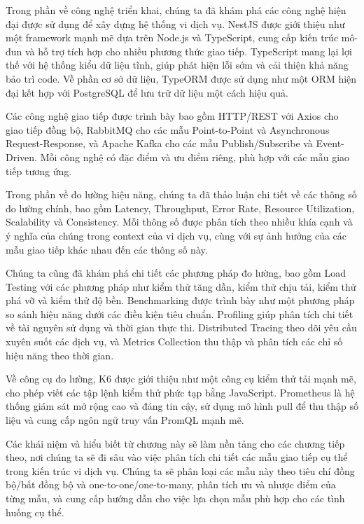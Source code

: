 Trong phần về công nghệ triển khai, chúng ta đã khám phá các công nghệ hiện đại được sử dụng để xây dựng hệ thống vi dịch vụ. NestJS được giới thiệu như một framework mạnh mẽ dựa trên Node.js và TypeScript, cung cấp kiến trúc mô-đun và hỗ trợ tích hợp cho nhiều phương thức giao tiếp. TypeScript mang lại lợi thế với hệ thống kiểu dữ liệu tĩnh, giúp phát hiện lỗi sớm và cải thiện khả năng bảo trì code. Về phần cơ sở dữ liệu, TypeORM được sử dụng như một ORM hiện đại kết hợp với PostgreSQL để lưu trữ dữ liệu một cách hiệu quả.

Các công nghệ giao tiếp được trình bày bao gồm HTTP/REST với Axios cho giao tiếp đồng bộ, RabbitMQ cho các mẫu Point-to-Point và Asynchronous Request-Response, và Apache Kafka cho các mẫu Publish/Subscribe và Event-Driven. Mỗi công nghệ có đặc điểm và ưu điểm riêng, phù hợp với các mẫu giao tiếp tương ứng.

Trong phần về đo lường hiệu năng, chúng ta đã thảo luận chi tiết về các thông số đo lường chính, bao gồm Latency, Throughput, Error Rate, Resource Utilization, Scalability và Consistency. Mỗi thông số được phân tích theo nhiều khía cạnh và ý nghĩa của chúng trong context của vi dịch vụ, cùng với sự ảnh hưởng của các mẫu giao tiếp khác nhau đến các thông số này.

Chúng ta cũng đã khám phá chi tiết các phương pháp đo lường, bao gồm Load Testing với các phương pháp như kiểm thử tăng dần, kiểm thử chịu tải, kiểm thử phá vỡ và kiểm thử độ bền. Benchmarking được trình bày như một phương pháp so sánh hiệu năng dưới các điều kiện tiêu chuẩn. Profiling giúp phân tích chi tiết về tài nguyên sử dụng và thời gian thực thi. Distributed Tracing theo dõi yêu cầu xuyên suốt các dịch vụ, và Metrics Collection thu thập và phân tích các chỉ số hiệu năng theo thời gian.

Về công cụ đo lường, K6 được giới thiệu như một công cụ kiểm thử tải mạnh mẽ, cho phép viết các tập lệnh kiểm thử phức tạp bằng JavaScript. Prometheus là hệ thống giám sát mở rộng cao và đáng tin cậy, sử dụng mô hình pull để thu thập số liệu và cung cấp ngôn ngữ truy vấn PromQL mạnh mẽ.

Các khái niệm và hiểu biết từ chương này sẽ làm nền tảng cho các chương tiếp theo, nơi chúng ta sẽ đi sâu vào việc phân tích chi tiết các mẫu giao tiếp cụ thể trong kiến trúc vi dịch vụ. Chúng ta sẽ phân loại các mẫu này theo tiêu chí đồng bộ/bất đồng bộ và one-to-one/one-to-many, phân tích ưu và nhược điểm của từng mẫu, và cung cấp hướng dẫn cho việc lựa chọn mẫu phù hợp cho các tình huống cụ thể.

